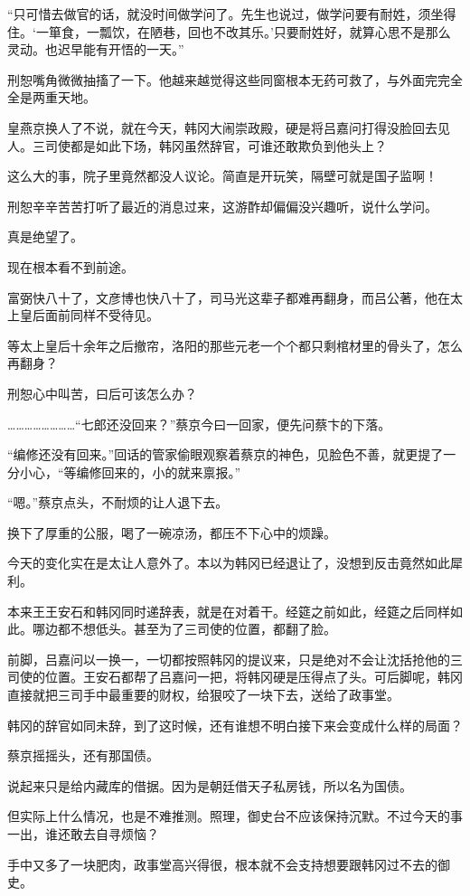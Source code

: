 “只可惜去做官的话，就没时间做学问了。先生也说过，做学问要有耐姓，须坐得住。‘一箪食，一瓢饮，在陋巷，回也不改其乐。’只要耐姓好，就算心思不是那么灵动。也迟早能有开悟的一天。”

刑恕嘴角微微抽搐了一下。他越来越觉得这些同窗根本无药可救了，与外面完完全全是两重天地。

皇燕京换人了不说，就在今天，韩冈大闹崇政殿，硬是将吕嘉问打得没脸回去见人。三司使都是如此下场，韩冈虽然辞官，可谁还敢欺负到他头上？

这么大的事，院子里竟然都没人议论。简直是开玩笑，隔壁可就是国子监啊！

刑恕辛辛苦苦打听了最近的消息过来，这游酢却偏偏没兴趣听，说什么学问。

真是绝望了。

现在根本看不到前途。

富弼快八十了，文彦博也快八十了，司马光这辈子都难再翻身，而吕公著，他在太上皇后面前同样不受待见。

等太上皇后十余年之后撤帘，洛阳的那些元老一个个都只剩棺材里的骨头了，怎么再翻身？

刑恕心中叫苦，曰后可该怎么办？

……………………“七郎还没回来？”蔡京今曰一回家，便先问蔡卞的下落。

“编修还没有回来。”回话的管家偷眼观察着蔡京的神色，见脸色不善，就更提了一分小心，“等编修回来的，小的就来禀报。”

“嗯。”蔡京点头，不耐烦的让人退下去。

换下了厚重的公服，喝了一碗凉汤，都压不下心中的烦躁。

今天的变化实在是太让人意外了。本以为韩冈已经退让了，没想到反击竟然如此犀利。

本来王王安石和韩冈同时递辞表，就是在对着干。经筵之前如此，经筵之后同样如此。哪边都不想低头。甚至为了三司使的位置，都翻了脸。

前脚，吕嘉问以一换一，一切都按照韩冈的提议来，只是绝对不会让沈括抢他的三司使的位置。王安石都帮了吕嘉问一把，将韩冈硬是压得点了头。可后脚呢，韩冈直接就把三司手中最重要的财权，给狠咬了一块下去，送给了政事堂。

韩冈的辞官如同未辞，到了这时候，还有谁想不明白接下来会变成什么样的局面？

蔡京摇摇头，还有那国债。

说起来只是给内藏库的借据。因为是朝廷借天子私房钱，所以名为国债。

但实际上什么情况，也是不难推测。照理，御史台不应该保持沉默。不过今天的事一出，谁还敢去自寻烦恼？

手中又多了一块肥肉，政事堂高兴得很，根本就不会支持想要跟韩冈过不去的御史。

